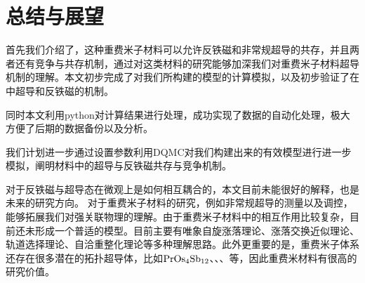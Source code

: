
\section{总结与展望}

首先我们介绍了，这种重费米子材料可以允许反铁磁和非常规超导的共存，并且两者还有竞争与共存机制，通过对这类材料的研究能够加深我们对重费米子材料超导机制的理解。本文初步完成了对我们所构建的模型的计算模拟，以及初步验证了在中超导和反铁磁的机制。

同时本文利用python对计算结果进行处理，成功实现了数据的自动化处理，极大方便了后期的数据备份以及分析。


我们计划进一步通过设置参数利用DQMC对我们构建出来的有效模型进行进一步模拟，阐明材料中的超导与反铁磁共存与竞争机制。

对于反铁磁与超导态在微观上是如何相互耦合的，本文目前未能很好的解释，也是未来的研究方向。
对于重费米子材料的研究，例如非常规超导的测量以及调控，能够拓展我们对强关联物理的理解。由于重费米子材料中的相互作用比较复杂，目前还未形成一个普适的模型。目前主要有唯象自旋涨落理论、涨落交换近似理论、轨道选择理论、自洽重整化理论等多种理解思路。此外更重要的是，重费米子体系还存在很多潜在的拓扑超导体，比如$\ce{PrOs_4Sb_{12}}$、、、等，因此重费米材料有很高的研究价值。
